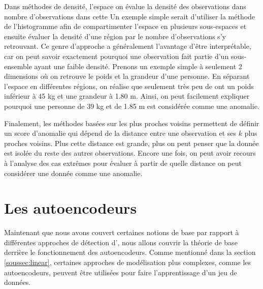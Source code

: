 Dans \DIFdelbegin {}\DIFdelend \DIFaddbegin {}\DIFaddend méthodes de densité, \DIFdelbegin {}\DIFdelend \DIFaddbegin {}\DIFaddend l'espace \DIFdelbegin {}\DIFdelend \DIFaddbegin {}\textit{}\DIFaddend on évalue la densité des observations dans \DIFdelbegin {}\DIFdelend \DIFaddbegin {}\DIFaddend nombre d'observations dans cette \DIFdelbegin {}\DIFdelend \DIFaddbegin {}\DIFaddend Un exemple simple serait d'utiliser la méthode de l'histogramme afin de compartimenter l'espace en plusieurs sous-espaces et ensuite évaluer la densité d'une région par le nombre d'observations s'y retrouvant. Ce genre d'approche a généralement l'avantage d'être interprétable, car on peut savoir exactement pourquoi une observation fait partie d'un sous-ensemble ayant une faible densité. Prenons un exemple simple à seulement 2 dimensions où on retrouve le poids et la grandeur d'une personne. En séparant l'espace en différentes régions, on réalise que seulement très peu de \DIFdelbegin {}\DIFdelend \DIFaddbegin {}\DIFaddend ont un poids inférieur à 45 kg et une grandeur \DIFdelbegin {}\DIFdelend \DIFaddbegin {}\DIFaddend à 1.80 m. Ainsi, on peut facilement expliquer pourquoi une personne de 39 kg et de 1.85 m est considérée comme une anomalie. 

 Finalement, les méthodes basées sur les plus proches voisins permettent de définir un score d'anomalie qui dépend de la distance entre une observation et ses $k$ plus proches voisins. Plus cette distance est grande, plus on peut penser que la donnée est isolée du reste des autres observations. Encore une fois, on peut avoir recours à l'analyse des cas extrêmes pour évaluer à partir de quelle distance on peut considérer une donnée comme une anomalie.


\section{Les autoencodeurs}

Maintenant que nous avons couvert certaines notions de base par rapport à différentes approches de détection d'\DIFdelbegin {}\DIFdelend \DIFaddbegin {}\DIFaddend , nous allons couvrir la théorie de base derrière le fonctionnement des autoencodeurs. Comme mentionné dans la section \ref{soussec:linear}, certaines approches de modélisation plus complexes, comme les autoencodeurs, peuvent être utilisées pour faire l'apprentissage d'un jeu de données. 

